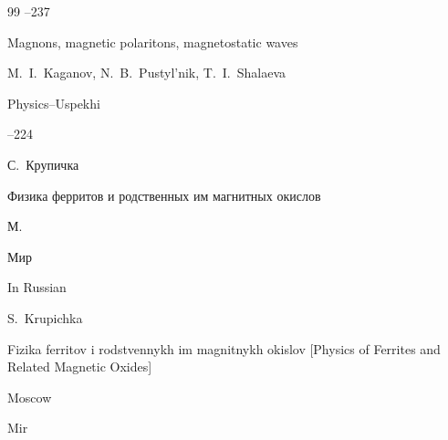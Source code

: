 \begin{thebibliography}{99}
–237


\transl 

\paper Magnons, magnetic polaritons, magnetostatic waves

\by M.~I.~Kaganov, N.~B.~Pustyl'nik, T.~I.~Shalaeva

\jour Physics–Uspekhi




–224





\by С.~Крупичка 

\book Физика ферритов и родственных им магнитных окислов

\publaddr М. 

\publ Мир 




\misctransl

\lang In Russian

\by S.~Krupichka

\book Fizika ferritov i rodstvennykh im magnitnykh okislov \rm [Physics of Ferrites and Related Magnetic Oxides]

\publaddr Moscow

\publ Mir












\end{thebibliography}





\renewcommand{\correctvfill}{\vspace{-9mm}}



\makeentitle



\newpage





%

